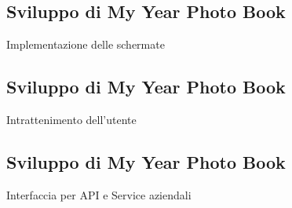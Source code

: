 	\subsection{Sviluppo di My Year Photo Book}
		\begin{frame}{Implementazione delle schermate}
		\end{frame}
	\subsection{Sviluppo di My Year Photo Book}
		\begin{frame}{Intrattenimento dell'utente}
		\end{frame}
	\subsection{Sviluppo di My Year Photo Book}
		\begin{frame}{Interfaccia per API e Service aziendali}
		\end{frame}
